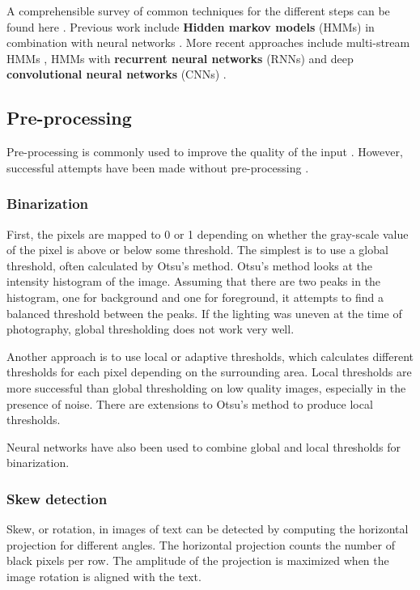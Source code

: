 A comprehensible survey of common techniques for the different steps can be found here \cite{HWR_survey}.
Previous work include \textbf{Hidden markov models} (HMMs) in combination with neural networks \cite{Offline_HWR_HMM_ANN}.
More recent approaches include multi-stream HMMs \cite{HWR_multi_stream_HMM_arabic}, HMMs with \textbf{recurrent neural networks} (RNNs) \cite{Offline_HWR_RNN} and deep \textbf{convolutional neural networks} (CNNs) \cite{offline_HWR_CNN}.

\subsection{Pre-processing}

Pre-processing is commonly used to improve the quality of the input \cite{HWR_survey}. However, successful attempts have been made without pre-processing \cite{FornesCnnCategorization}.

\subsubsection{Binarization}

First, the pixels are mapped to 0 or 1 depending on whether the gray-scale value of the pixel is above or below some threshold. The simplest is to use a global threshold, often calculated by Otsu's method. Otsu's method looks at the intensity histogram of the image. Assuming that there are two peaks in the histogram, one for background and one for foreground, it attempts to find a balanced threshold between the peaks. If the lighting was uneven at the time of photography, global thresholding does not work very well.

Another approach is to use local or adaptive thresholds, which calculates different thresholds for each pixel depending on the surrounding area. Local thresholds are more successful than global thresholding on low quality images, especially in the presence of noise. There are extensions to Otsu's method to produce local thresholds.

Neural networks have also been used to combine global and local thresholds for binarization.

\subsubsection{Skew detection}

Skew, or rotation, in images of text can be detected by computing the horizontal projection for different angles. The horizontal projection counts the number of black pixels per row. The amplitude of the projection is maximized when the image rotation is aligned with the text.

